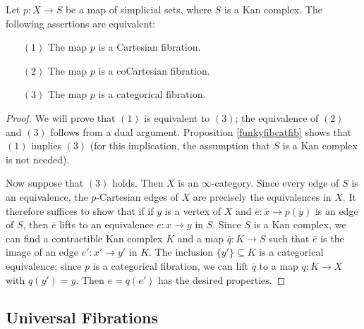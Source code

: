 \begin{proposition}\label{groob}
Let $p: X \rightarrow S$ be a map of simplicial sets, where $S$ is a Kan complex.
The following assertions are equivalent:
\begin{itemize}
\item[$(1)$] The map $p$ is a Cartesian fibration.
\item[$(2)$] The map $p$ is a coCartesian fibration.
\item[$(3)$] The map $p$ is a categorical fibration.
\end{itemize}
\end{proposition}

\begin{proof}
We will prove that $(1)$ is equivalent to $(3)$; the equivalence of $(2)$ and $(3)$ follows from a dual argument. Proposition \ref{funkyfibcatfib} shows that $(1)$ implies $(3)$ (for this implication, the assumption that $S$ is a Kan complex is not needed).

Now suppose that $(3)$ holds. Then $X$ is an $\infty$-category. Since every edge of $S$ is an equivalence, the $p$-Cartesian edges of $X$ are precisely the equivalences in $X$. It therefore suffices to show that if if $y$ is a vertex of $X$ and $\overline{e}: \overline{x} \rightarrow p(y)$ is an edge of $S$, then $\overline{e}$ lifts to an equivalence $e: x \rightarrow y$ in $S$. Since
$S$ is a Kan complex, we can find a contractible Kan complex $K$ and a map
$\overline{q}: K \rightarrow S$ such that $\overline{e}$ is the image of an edge $e': x' \rightarrow y'$ in $K$. 
The inclusion $\{y'\} \subseteq K$ is a categorical equivalence; since $p$ is a categorical fibration, we can lift $\overline{q}$ to a map $q: K \rightarrow X$ with $q(y')=y$. Then $e=q(e')$ has the desired properties.
\end{proof}

\subsection{Universal Fibrations}\label{universalfib}

